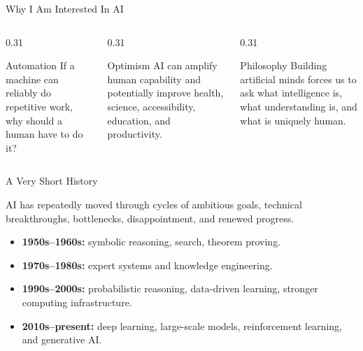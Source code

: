 \documentclass[aspectratio=169]{beamer}
\begin{document}
\begin{frame}[shrink=4]{Why I Am Interested In AI}
  \begin{columns}[T,onlytextwidth]
    \begin{column}{0.31\textwidth}
      \begin{block}{Automation}
        If a machine can reliably do repetitive work, why should a human have to do it?
      \end{block}
    \end{column}
    \begin{column}{0.31\textwidth}
      \begin{block}{Optimism}
        AI can amplify human capability and potentially improve health, science, accessibility, education, and productivity.
      \end{block}
    \end{column}
    \begin{column}{0.31\textwidth}
      \begin{block}{Philosophy}
        Building artificial minds forces us to ask what intelligence is, what understanding is, and what is uniquely human.
      \end{block}
    \end{column}
  \end{columns}
\end{frame}


\begin{frame}{A Very Short History}
  \begin{keyidea}
    AI has repeatedly moved through cycles of ambitious goals, technical breakthroughs, bottlenecks, disappointment, and renewed progress.
  \end{keyidea}
  \vspace{0.08in}
  \begin{itemize}
    \item \textbf{1950s--1960s:} symbolic reasoning, search, theorem proving.
    \item \textbf{1970s--1980s:} expert systems and knowledge engineering.
    \item \textbf{1990s--2000s:} probabilistic reasoning, data-driven learning, stronger computing infrastructure.
    \item \textbf{2010s--present:} deep learning, large-scale models, reinforcement learning, and generative AI.
  \end{itemize}
\end{frame}
\end{document}
